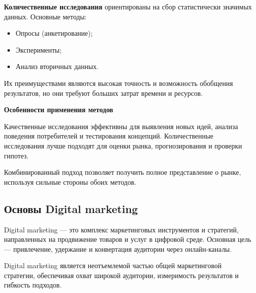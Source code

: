 \textbf{Количественные исследования} ориентированы на сбор статистически значимых данных. Основные методы:
\begin{itemize}
    \item Опросы (анкетирование);
    \item Эксперименты;
    \item Анализ вторичных данных.
\end{itemize}
Их преимуществами являются высокая точность и возможность обобщения результатов, но они требуют больших затрат времени и ресурсов.

\textbf{Особенности применения методов}

Качественные исследования эффективны для выявления новых идей, анализа поведения потребителей и тестирования концепций. Количественные исследования лучше подходят для оценки рынка, прогнозирования и проверки гипотез.

Комбинированный подход позволяет получить полное представление о рынке, используя сильные стороны обоих методов.


\pagebreak

\subsection{Основы Digital marketing}

Digital marketing --- это комплекс маркетинговых инструментов и стратегий, направленных на продвижение товаров и услуг в цифровой среде. Основная цель --- привлечение, удержание и конвертация аудитории через онлайн-каналы. 

Digital marketing является неотъемлемой частью общей маркетинговой стратегии, обеспечивая охват широкой аудитории, измеримость результатов и гибкость подходов.

